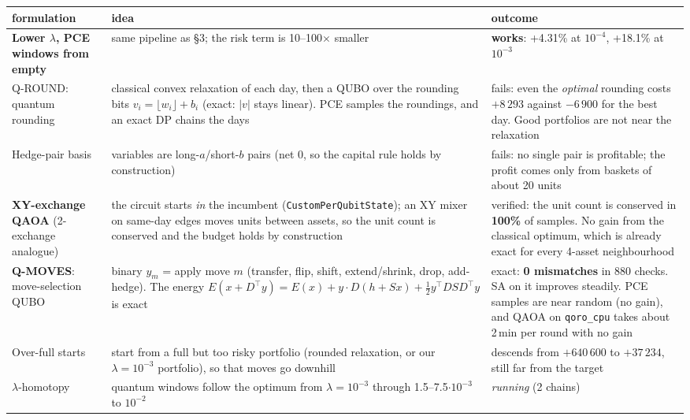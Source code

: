 \documentclass[11pt]{article}
\begin{document}
\begin{center}\small
\renewcommand{\arraystretch}{1.18}
\begin{tabularx}{\textwidth}{@{}>{\raggedright\arraybackslash}p{30mm}L>{\raggedright\arraybackslash}p{44mm}@{}}
\toprule
formulation & idea & outcome\\
\midrule
\textbf{Lower $\lambda$, PCE windows from empty} & same pipeline as \S3; the risk term is 10--100$\times$ smaller & \textcolor{good}{\textbf{works}}: +4.31\% at $10^{-4}$, +18.1\% at $10^{-3}$\\
Q-ROUND: quantum rounding & classical convex relaxation of each day, then a QUBO over the rounding bits $v_i=\lfloor w_i\rfloor+b_i$ (exact: $|v|$ stays linear). PCE samples the roundings, and an exact DP chains the days & \textcolor{bad}{fails}: even the \emph{optimal} rounding costs $+8\,293$ against $-6\,900$ for the best day. Good portfolios are not near the relaxation\\
Hedge-pair basis & variables are long-$a$/short-$b$ pairs (net 0, so the capital rule holds by construction) & \textcolor{bad}{fails}: no single pair is profitable; the profit comes only from baskets of about 20 units\\
\textbf{XY-exchange QAOA} (2-exchange analogue) & the circuit starts \emph{in} the incumbent (\texttt{CustomPerQubitState}); an XY mixer on same-day edges moves units between assets, so the unit count is conserved and the budget holds by construction & verified: the unit count is conserved in \textbf{100\%} of samples. No gain from the classical optimum, which is already exact for every 4-asset neighbourhood\\
\textbf{Q-MOVES}: move-selection QUBO & binary $y_m$ = apply move $m$ (transfer, flip, shift, extend/shrink, drop, add-hedge). The energy $E(x{+}D^\top y)=E(x)+y\cdot D(h{+}Sx)+\tfrac12 y^\top DSD^\top y$ is exact & exact: \textbf{0 mismatches} in 880 checks. SA on it improves steadily. PCE samples are near random (no gain), and QAOA on \texttt{qoro\_cpu} takes about 2\,min per round with no gain\\
Over-full starts & start from a full but too risky portfolio (rounded relaxation, or our $\lambda=10^{-3}$ portfolio), so that moves go downhill & descends from $+640\,600$ to $+37\,234$, still far from the target\\
$\lambda$-homotopy & quantum windows follow the optimum from $\lambda=10^{-3}$ through 1.5--7.5$\cdot10^{-3}$ to $10^{-2}$ & \emph{running} (2 chains)\\
\bottomrule
\end{tabularx}
\end{center}
\end{document}
